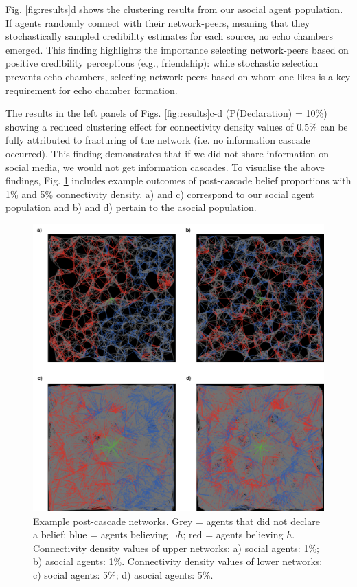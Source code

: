 \documentclass[fleqn,10pt]{wlscirep}
\begin{document}
Fig. \ref{fig:results}d shows the clustering results from our asocial agent population. If agents randomly connect with their network-peers, meaning that they stochastically sampled credibility estimates for each source, no echo chambers emerged. This finding highlights the importance selecting network-peers based on positive credibility perceptions (e.g., friendship): while stochastic selection prevents echo chambers, selecting network peers based on whom one likes is a key requirement for echo chamber formation.

The results in the left panels of Figs. \ref{fig:results}c-d (P(Declaration) = 10\%) showing a reduced clustering effect for connectivity density values of 0.5\% can be fully attributed to fracturing of the network (i.e. no information cascade occurred). This finding demonstrates that if we did not share information on social media, we would not get information cascades. To visualise the above findings, Fig. \ref{fig:example_nets} includes example outcomes of post-cascade belief proportions with 1\% and 5\% connectivity density. a) and c) correspond to our social agent population and b) and d) pertain to the asocial population. 

\begin{figure}[ht]
\centering
\includegraphics[width=0.8\columnwidth]{img/example_networks.pdf}
\caption{Example post-cascade networks. Grey = agents that did not declare a belief; blue = agents believing \(\neg h\); red = agents believing \(h\). Connectivity density values of upper networks: a) social agents: 1\%; b) asocial agents: 1\%. Connectivity density values of lower networks: c) social agents: 5\%; d) asocial agents: 5\%.}
\label{fig:example_nets}
\end{figure}
\end{document}
